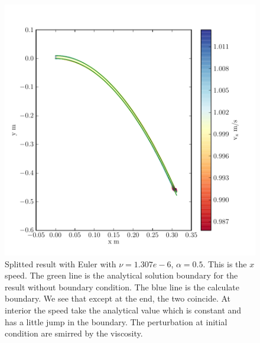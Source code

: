 \begin{figure}
	\includegraphics{topology/lateral_jet/plot_10__1_293.pdf}
			\caption{Splitted result with Euler with $\nu=1.307e-6$, $\alpha=0.5$.
	This is the $x$ speed.
	The green line is the analytical solution boundary for the result without boundary condition.
	The blue line is the calculate boundary.
	We see that except at the end, the two coincide.
	At interior the speed take the analytical value which is constant and has a little jump in the boundary.
	The perturbation at initial condition are smirred by the viscosity.}
	\label{topo:extrap:lateral:10_1}
\end{figure}

